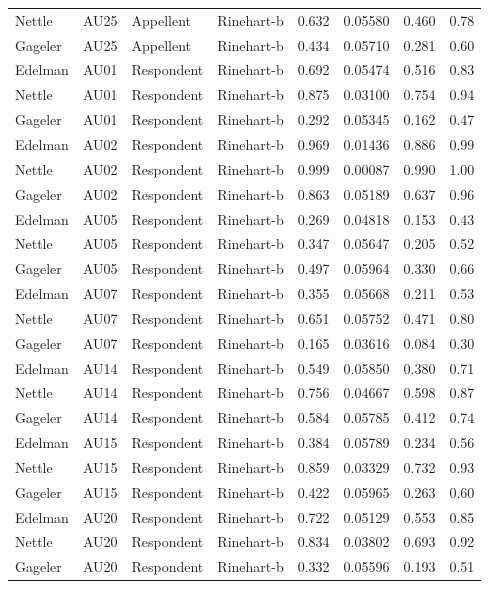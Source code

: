 \documentclass{monashthesis}
\begin{document}
\begin{center}
\begin{longtable}{llllllll}
Nettle & AU25 & Appellent & Rinehart-b & 0.632 & 0.05580 & 0.460 & 0.78 \\
Gageler & AU25 & Appellent & Rinehart-b & 0.434 & 0.05710 & 0.281 & 0.60 \\
Edelman & AU01 & Respondent & Rinehart-b & 0.692 & 0.05474 & 0.516 & 0.83 \\
Nettle & AU01 & Respondent & Rinehart-b & 0.875 & 0.03100 & 0.754 & 0.94 \\
Gageler & AU01 & Respondent & Rinehart-b & 0.292 & 0.05345 & 0.162 & 0.47 \\
Edelman & AU02 & Respondent & Rinehart-b & 0.969 & 0.01436 & 0.886 & 0.99 \\
Nettle & AU02 & Respondent & Rinehart-b & 0.999 & 0.00087 & 0.990 & 1.00 \\
Gageler & AU02 & Respondent & Rinehart-b & 0.863 & 0.05189 & 0.637 & 0.96 \\
Edelman & AU05 & Respondent & Rinehart-b & 0.269 & 0.04818 & 0.153 & 0.43 \\
Nettle & AU05 & Respondent & Rinehart-b & 0.347 & 0.05647 & 0.205 & 0.52 \\
Gageler & AU05 & Respondent & Rinehart-b & 0.497 & 0.05964 & 0.330 & 0.66 \\
Edelman & AU07 & Respondent & Rinehart-b & 0.355 & 0.05668 & 0.211 & 0.53 \\
Nettle & AU07 & Respondent & Rinehart-b & 0.651 & 0.05752 & 0.471 & 0.80 \\
Gageler & AU07 & Respondent & Rinehart-b & 0.165 & 0.03616 & 0.084 & 0.30 \\
Edelman & AU14 & Respondent & Rinehart-b & 0.549 & 0.05850 & 0.380 & 0.71 \\
Nettle & AU14 & Respondent & Rinehart-b & 0.756 & 0.04667 & 0.598 & 0.87 \\
Gageler & AU14 & Respondent & Rinehart-b & 0.584 & 0.05785 & 0.412 & 0.74 \\
Edelman & AU15 & Respondent & Rinehart-b & 0.384 & 0.05789 & 0.234 & 0.56 \\
Nettle & AU15 & Respondent & Rinehart-b & 0.859 & 0.03329 & 0.732 & 0.93 \\
Gageler & AU15 & Respondent & Rinehart-b & 0.422 & 0.05965 & 0.263 & 0.60 \\
Edelman & AU20 & Respondent & Rinehart-b & 0.722 & 0.05129 & 0.553 & 0.85 \\
Nettle & AU20 & Respondent & Rinehart-b & 0.834 & 0.03802 & 0.693 & 0.92 \\
Gageler & AU20 & Respondent & Rinehart-b & 0.332 & 0.05596 & 0.193 & 0.51 \\

\end{longtable}
\end{center}
\end{document}
